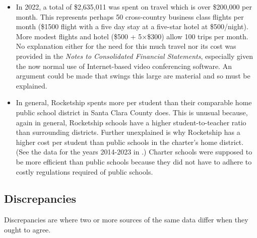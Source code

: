\begin{itemize}
  \item In 2022, a total of \$2,635,011 was spent on travel which is over \$200,000 per month. This represents perhaps 50 cross-country business class flights per month (\$1500 flight with a five day stay at a five-star hotel at \$500/night).  More modest flights and hotel (\$500 + 5×\$300) allow 100 trips per month.  No explanation either for the need for this much travel nor its cost was provided in the \textit{Notes to Consolidated Financial Statements}, especially given the now normal use of Internet-based video conferencing software. An argument could be made that swings this large are material and so must be explained.
  
  \item In general, Rocketship spents more per student than their comparable home public school district in Santa Clara County does. This is unusual because, again in general, Rocketship schools have a higher student-to-teacher ratio than surrounding districts. Further unexplained is why Rocketship has a higher cost per student than public schools in the charter's home district. (See the data for the years 2014-2023 in \textcite{SCCOE14-23}.) Charter schools were supposed to be more efficient than public schools because they did not have to adhere to costly regulations required of public schools.
\end{itemize}

\subsection{Discrepancies}%
\label{sec:discrepancies}\indent%

Discrepancies are where two or more sources of the same data differ when they ought to agree.

